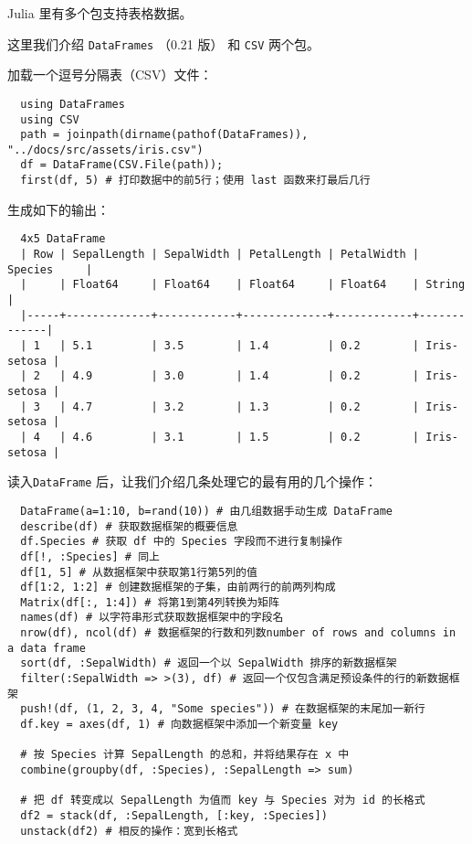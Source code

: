 \documentclass[10pt,a4paper]{article}
\begin{document}
Julia 里有多个包支持表格数据。

这里我们介绍 \lstinline|DataFrames| （0.21 版） 和 \lstinline|CSV| 两个包。

加载一个逗号分隔表（CSV）文件：
\begin{lstlisting}
  using DataFrames
  using CSV
  path = joinpath(dirname(pathof(DataFrames)), "../docs/src/assets/iris.csv")
  df = DataFrame(CSV.File(path));
  first(df, 5) # 打印数据中的前5行；使用 last 函数来打最后几行
\end{lstlisting}

生成如下的输出：
\begin{lstlisting}
  4x5 DataFrame
  | Row | SepalLength | SepalWidth | PetalLength | PetalWidth | Species     |
  |     | Float64     | Float64    | Float64     | Float64    | String      |
  |-----+-------------+------------+-------------+------------+-------------|
  | 1   | 5.1         | 3.5        | 1.4         | 0.2        | Iris-setosa |
  | 2   | 4.9         | 3.0        | 1.4         | 0.2        | Iris-setosa |
  | 3   | 4.7         | 3.2        | 1.3         | 0.2        | Iris-setosa |
  | 4   | 4.6         | 3.1        | 1.5         | 0.2        | Iris-setosa |
\end{lstlisting}

读入\lstinline|DataFrame| 后，让我们介绍几条处理它的最有用的几个操作：
\begin{lstlisting}
  DataFrame(a=1:10, b=rand(10)) # 由几组数据手动生成 DataFrame
  describe(df) # 获取数据框架的概要信息
  df.Species # 获取 df 中的 Species 字段而不进行复制操作
  df[!, :Species] # 同上
  df[1, 5] # 从数据框架中获取第1行第5列的值
  df[1:2, 1:2] # 创建数据框架的子集，由前两行的前两列构成
  Matrix(df[:, 1:4]) # 将第1到第4列转换为矩阵
  names(df) # 以字符串形式获取数据框架中的字段名
  nrow(df), ncol(df) # 数据框架的行数和列数number of rows and columns in a data frame
  sort(df, :SepalWidth) # 返回一个以 SepalWidth 排序的新数据框架
  filter(:SepalWidth => >(3), df) # 返回一个仅包含满足预设条件的行的新数据框架
  push!(df, (1, 2, 3, 4, "Some species")) # 在数据框架的末尾加一新行
  df.key = axes(df, 1) # 向数据框架中添加一个新变量 key

  # 按 Species 计算 SepalLength 的总和，并将结果存在 x 中
  combine(groupby(df, :Species), :SepalLength => sum)

  # 把 df 转变成以 SepalLength 为值而 key 与 Species 对为 id 的长格式
  df2 = stack(df, :SepalLength, [:key, :Species])
  unstack(df2) # 相反的操作：宽到长格式
\end{lstlisting}
\end{document}
